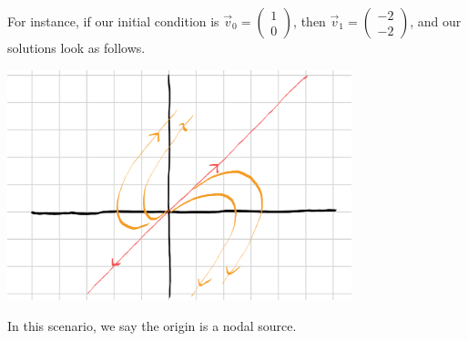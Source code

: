 \documentclass[10pt]{mypackage}
\begin{document}
\begin{example}
  For instance, if our initial condition is $\vec{v}_0 = \begin{pmatrix}1\\0\end{pmatrix}$, then $\vec{v}_1 = \begin{pmatrix}-2\\-2\end{pmatrix}$, and our solutions look as follows.
  \begin{center}
    \includegraphics[width=10cm]{images/nodal_source.png}
  \end{center}
  In this scenario, we say the origin is a nodal source.
\end{example}
\end{document}
